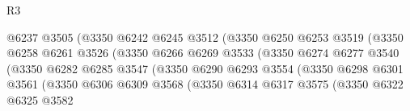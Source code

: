 \begin{lexlean}{R3}
\begin{coremodule}
                                        @6237
                                        @3505
                                        (@3350
                                          @6242
                                          @6245
                                          @3512
                                          (@3350
                                            @6250
                                            @6253
                                            @3519
                                            (@3350
                                              @6258
                                              @6261
                                              @3526
                                              (@3350
                                                @6266
                                                @6269
                                                @3533
                                                (@3350
                                                  @6274
                                                  @6277
                                                  @3540
                                                  (@3350
                                                    @6282
                                                    @6285
                                                    @3547
                                                    (@3350
                                                      @6290
                                                      @6293
                                                      @3554
                                                      (@3350
                                                        @6298
                                                        @6301
                                                        @3561
                                                        (@3350
                                                          @6306
                                                          @6309
                                                          @3568
                                                          (@3350
                                                            @6314
                                                            @6317
                                                            @3575
                                                            (@3350
                                                              @6322
                                                              @6325
                                                              @3582

\end{coremodule}
\end{lexlean}
